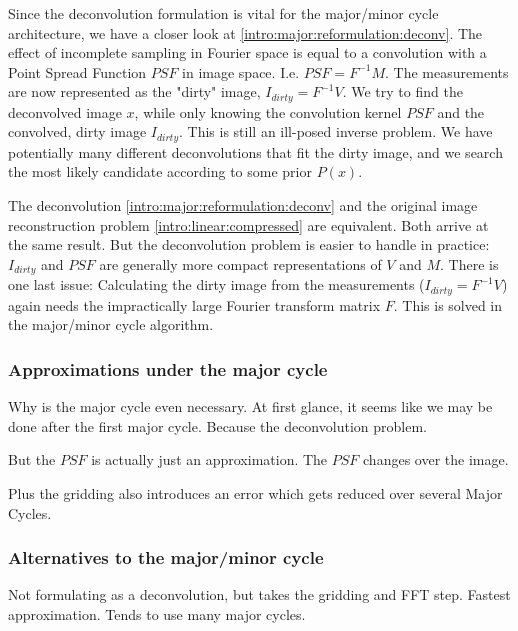 Since the deconvolution formulation is vital for the major/minor cycle architecture, we have a closer look at \eqref{intro:major:reformulation:deconv}. The effect of incomplete sampling in Fourier space is equal to a convolution with a Point Spread Function $PSF$ in image space. I.e. $PSF = F^{-1}M$. The measurements are now represented as the "dirty" image, $I_{dirty} = F^{-1}V$. We try to find the deconvolved image $x$, while only knowing the convolution kernel $PSF$ and the convolved, dirty image $I_{dirty}$. This is still an ill-posed inverse problem. We have potentially many different deconvolutions that fit the dirty image, and we search the most likely candidate according to some prior $P(x)$. 

The deconvolution \eqref{intro:major:reformulation:deconv} and the original image reconstruction problem \eqref{intro:linear:compressed} are equivalent. Both arrive at the same result. But the deconvolution problem is easier to handle in practice: $I_{dirty}$ and $PSF$ are generally more compact representations of $V$ and $M$. There is one last issue: Calculating the dirty image from the measurements ($I_{dirty} = F^{-1}V$) again needs the impractically large Fourier transform matrix $F$. This is solved in the major/minor cycle algorithm.

\subsubsection{Approximations under the major cycle} \label{intro:major:approximations}
Why is the major cycle even necessary. At first glance, it seems like we may be done after the first major cycle. Because the deconvolution problem.

But the $PSF$ is actually just an approximation. The $PSF$ changes over the image.

Plus the gridding also introduces an error which gets reduced over several Major Cycles.

\subsubsection{Alternatives to the major/minor cycle}
Not formulating as a deconvolution, but takes the gridding and FFT step. Fastest approximation. Tends to use many major cycles.
